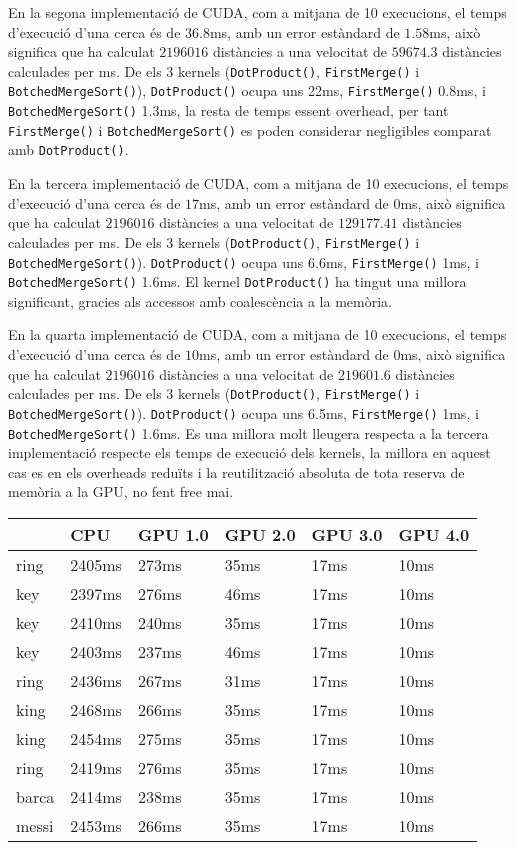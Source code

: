 \documentclass[catalan,10pt,a4paper]{article}
\begin{document}
En la segona implementació de CUDA, com a mitjana de 10 execucions, el temps d'execució d'una cerca és de $36.8$ms, amb un error estàndard de $1.58$ms, això significa que ha calculat $2196016$ distàncies a una velocitat de $59674.3$ distàncies calculades per ms. De els 3 kernels (\verb|DotProduct()|, \verb|FirstMerge()| i \verb|BotchedMergeSort()|), \verb|DotProduct()| ocupa uns 22ms, \verb|FirstMerge()| 0.8ms, i \verb|BotchedMergeSort()| 1.3ms, la resta de temps essent overhead, per tant \verb|FirstMerge()| i \verb|BotchedMergeSort()| es poden considerar negligibles comparat amb \verb|DotProduct()|.

En la tercera implementació de CUDA, com a mitjana de 10 execucions, el temps d'execució d'una cerca és de $17$ms, amb un error estàndard de $0$ms, això significa que ha calculat $2196016$ distàncies a una velocitat de $129177.41$ distàncies calculades per ms. De els 3 kernels (\verb|DotProduct()|, \verb|FirstMerge()| i \verb|BotchedMergeSort()|). \verb|DotProduct()| ocupa uns 6.6ms, \verb|FirstMerge()| 1ms, i \verb|BotchedMergeSort()| 1.6ms. El kernel \verb|DotProduct()| ha tingut una millora significant, gracies als accessos amb coalescència a la memòria.

En la quarta implementació de CUDA, com a mitjana de 10 execucions, el temps d'execució d'una cerca és de $10$ms, amb un error estàndard de $0$ms, això significa que ha calculat $2196016$ distàncies a una velocitat de $219601.6$ distàncies calculades per ms. De els 3 kernels (\verb|DotProduct()|, \verb|FirstMerge()| i \verb|BotchedMergeSort()|). \verb|DotProduct()| ocupa uns 6.5ms, \verb|FirstMerge()| 1ms, i \verb|BotchedMergeSort()| 1.6ms. Es una millora molt lleugera respecta a la tercera implementació respecte els temps de execució dels kernels, la millora en aquest cas es en els overheads reduïts i la reutilització absoluta de tota reserva de memòria a la GPU, no fent free mai.



\begin{table}[h]
\centering
\begin{tabular}{|l|l|l|l|l|l|}
\hline
      & CPU  & GPU 1.0 & GPU 2.0 & GPU 3.0 & GPU 4.0 \\ \hline
ring  & 2405ms & 273ms & 35ms & 17ms & 10ms \\ \hline
key   & 2397ms & 276ms & 46ms & 17ms & 10ms\\ \hline
key   & 2410ms & 240ms & 35ms & 17ms & 10ms\\ \hline
key   & 2403ms & 237ms & 46ms & 17ms & 10ms\\ \hline
ring  & 2436ms & 267ms & 31ms & 17ms & 10ms\\ \hline
king  & 2468ms & 266ms & 35ms & 17ms & 10ms\\ \hline
king  & 2454ms & 275ms & 35ms & 17ms & 10ms\\ \hline
ring  & 2419ms & 276ms & 35ms & 17ms & 10ms\\ \hline
barca & 2414ms & 238ms & 35ms & 17ms & 10ms\\ \hline
messi & 2453ms & 266ms & 35ms & 17ms & 10ms\\ \hline
\end{tabular}
\end{table}
\end{document}
